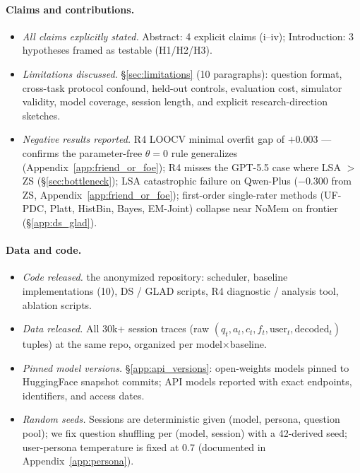 \documentclass[11pt]{article}
\begin{document}
\paragraph{Claims and contributions.}
\begin{itemize}[nosep,leftmargin=1.4em]
  \item \emph{All claims explicitly stated.} \checkmark{} Abstract: 4 explicit claims (i--iv); Introduction: 3 hypotheses framed as testable (H1/H2/H3).
  \item \emph{Limitations discussed.} \checkmark{} \S\ref{sec:limitations} (10 paragraphs): question format, cross-task protocol confound, held-out controls, evaluation cost, simulator validity, model coverage, session length, and explicit research-direction sketches.
  \item \emph{Negative results reported.} \checkmark{} R4 LOOCV minimal overfit gap of $+0.003$ — confirms the parameter-free $\theta=0$ rule generalizes (Appendix~\ref{app:friend_or_foe}); R4 misses the GPT-5.5 case where LSA $>$ ZS (\S\ref{sec:bottleneck}); LSA catastrophic failure on Qwen-Plus ($-$0.300 from ZS, Appendix~\ref{app:friend_or_foe}); first-order single-rater methods (UF-PDC, Platt, HistBin, Bayes, EM-Joint) collapse near NoMem on frontier (\S\ref{app:ds_glad}).
\end{itemize}

\paragraph{Data and code.}
\begin{itemize}[nosep,leftmargin=1.4em]
  \item \emph{Code released.} \checkmark{} the anonymized repository: scheduler, baseline implementations (10), DS / GLAD scripts, R4 diagnostic / analysis tool, ablation scripts.
  \item \emph{Data released.} \checkmark{} All 30k+ session traces (raw $(q_t, a_t, c_t, f_t, \text{user}_t, \text{decoded}_t)$ tuples) at the same repo, organized per model$\times$baseline.
  \item \emph{Pinned model versions.} \checkmark{} \S\ref{app:api_versions}: open-weights models pinned to HuggingFace snapshot commits; API models reported with exact endpoints, identifiers, and access dates.
  \item \emph{Random seeds.} Sessions are deterministic given (model, persona, question pool); we fix question shuffling per (model, session) with a 42-derived seed; user-persona temperature is fixed at 0.7 (documented in Appendix~\ref{app:persona}).
\end{itemize}
\end{document}
